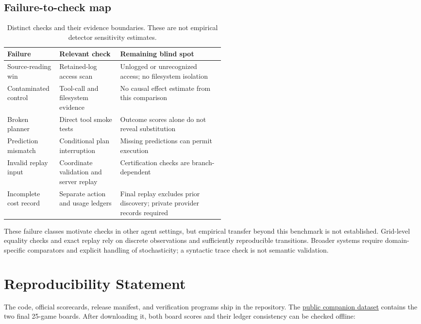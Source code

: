 \documentclass[11pt]{article}
\begin{document}
\subsection{Failure-to-check map}

\begin{table}[ht]
\centering
\small
\caption{Distinct checks and their evidence boundaries. These are not empirical detector sensitivity estimates.}
\begin{tabularx}{\linewidth}{@{}p{0.24\linewidth}p{0.28\linewidth}X@{}}
\toprule
Failure & Relevant check & Remaining blind spot \\
\midrule
Source-reading win & Retained-log access scan & Unlogged or unrecognized access; no filesystem isolation \\
Contaminated control & Tool-call and filesystem evidence & No causal effect estimate from this comparison \\
Broken planner & Direct tool smoke tests & Outcome scores alone do not reveal substitution \\
Prediction mismatch & Conditional plan interruption & Missing predictions can permit execution \\
Invalid replay input & Coordinate validation and server replay & Certification checks are branch-dependent \\
Incomplete cost record & Separate action and usage ledgers & Final replay excludes prior discovery; private provider records required \\
\bottomrule
\end{tabularx}
\end{table}

These failure classes motivate checks in other agent settings, but empirical
transfer beyond this benchmark is not established. Grid-level equality checks
and exact replay rely on discrete observations and sufficiently reproducible
transitions. Broader systems require domain-specific comparators and explicit
handling of stochasticity; a syntactic trace check is not semantic validation.

\section{Reproducibility Statement}\label{sec:repro}

The code, official scorecards, release manifest, and verification programs ship in the repository. The \href{https://huggingface.co/datasets/cveinnt/kepler-arc-agi-3-traces}{public companion dataset} contains the two final 25-game boards. After downloading it, both board scores and their ledger consistency can be checked offline:
\end{document}
